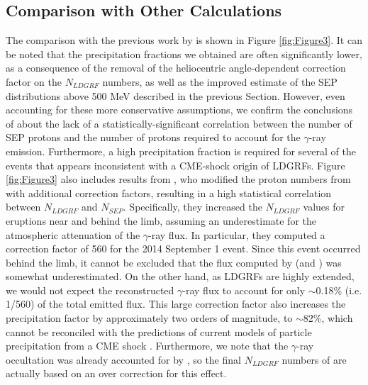 \documentclass{aastex61}
\begin{document}
\subsection{Comparison with Other Calculations}\label{Comparison with Other Calculations}
The comparison with the previous work by \citet{ref:DENOLFO2019} is shown in Figure \ref{fig:Figure3}.
It can be noted that the precipitation fractions we obtained are often significantly lower, as a consequence of the removal of the heliocentric angle-dependent correction factor on the $N_{LDGRF}$ numbers, as well as the improved estimate of the SEP distributions above 500 MeV described in the previous Section. However, even accounting for these more conservative assumptions, we confirm the conclusions of \citet{ref:DENOLFO2019} 
about the lack of a statistically-significant correlation between the number of SEP protons and the number of protons required to account for the $\gamma$-ray emission. Furthermore, a high precipitation fraction is required for several of the events that appears inconsistent with a CME-shock origin of LDGRFs.
Figure \ref{fig:Figure3}
also includes results
from \citet{ref:GOPALSWAMY2021}, who modified the proton numbers from \citet{ref:DENOLFO2019} with additional correction factors, resulting in a high statistical correlation between $N_{LDGRF}$ and $N_{SEP}$.
Specifically, they increased the $N_{LDGRF}$ values for eruptions near and behind the limb, assuming an underestimate for the atmospheric attenuation of the $\gamma$-ray flux. In particular, they computed a correction factor of 560 for the 2014 September 1 event. Since this event occurred behind the limb, it cannot be excluded that the flux computed by \citet{ref:SHARE2018} (and \citet{ref:AJELLO2021}) was somewhat underestimated. On the other hand, as LDGRFs are highly extended, 
we would not expect the reconstructed $\gamma$-ray flux to account for only $\sim$0.18\% (i.e. 1/560) of the total emitted flux. 
This large correction factor also increases the precipitation factor by approximately two orders of magnitude, to $\sim$82\%, which cannot be reconciled with the predictions of current models of particle precipitation from a CME shock \citep{ref:HUTCHINSON2022}.   
Furthermore, we note that the $\gamma$-ray occultation was already accounted for by \citet{ref:SHARE2018}, so the final $N_{LDGRF}$ numbers of \citet{ref:GOPALSWAMY2021} are actually based on an over correction for this effect.
\end{document}
